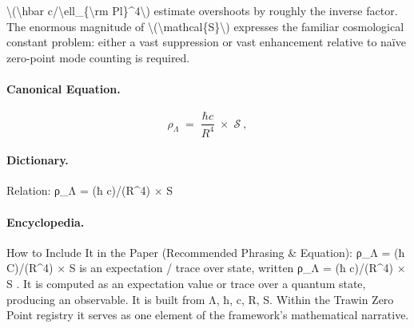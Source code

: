 \textbackslash{}(\textbackslash{}hbar c/\textbackslash{}ell\_\{\textbackslash{}rm Pl\}\textasciicircum{}4\textbackslash{}) estimate overshoots by roughly the inverse factor. The enormous magnitude of \textbackslash{}(\textbackslash{}mathcal\{S\}\textbackslash{}) expresses the familiar cosmological constant problem: either a vast suppression or vast enhancement relative to naïve zero-point mode counting is required.

\paragraph{Canonical Equation.}
\[
\boxed{\ \rho_\Lambda \;=\; \frac{\hbar c}{R^4}\;\times\;\mathcal{S}\ ,\ }
\]

\paragraph{Dictionary.}
Relation: ρ\_Λ = (ħ c)/(R\textasciicircum{}4) × S

\paragraph{Encyclopedia.}
How to Include It in the Paper (Recommended Phrasing \& Equation): ρ\_Λ = (ħ C)/(R\textasciicircum{}4) × S is an expectation / trace over state, written ρ\_Λ = (ħ c)/(R\textasciicircum{}4) × S . It is computed as an expectation value or trace over a quantum state, producing an observable. It is built from Λ, ħ, c, R, S. Within the Trawin Zero Point registry it serves as one element of the framework's mathematical narrative.
